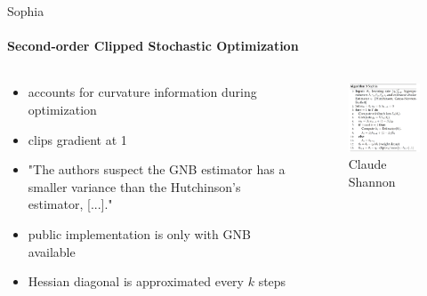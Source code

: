 \documentclass[
	11pt, %
	aspectratio=169, %
]{beamer}
\begin{document}
\begin{frame}{Sophia}
	\framesubtitle{\textbf{S}econd-\textbf{o}rder Clip\textbf{p}ed Stoc\textbf{h}astic Opt\textbf{i}miz\textbf{a}tion}
	 \begin{columns}[c] %
		\begin{column}{0.45\textwidth} %
			\begin{itemize}
				\item accounts for curvature information during optimization
				\item clips gradient at 1
				\item "The authors suspect the GNB estimator has a smaller variance than the Hutchinson’s
				estimator, [...]."
				\item public implementation is only with GNB available
				\item Hessian diagonal is approximated every $k$ steps
			\end{itemize}
		\end{column}
		\begin{column}{0.55\textwidth} %
        	\begin{figure}
        	    \centering
                \includegraphics[width=6.5cm]{figures/sophia_algo.png}
        	    \caption*{Claude Shannon}
        	\end{figure}
		\end{column}
	\end{columns}
\end{frame}
\end{document}
